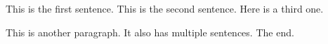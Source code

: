 This is the first sentence. This is the second sentence. Here is a third one.

This is another paragraph. It also has multiple sentences. The end.
